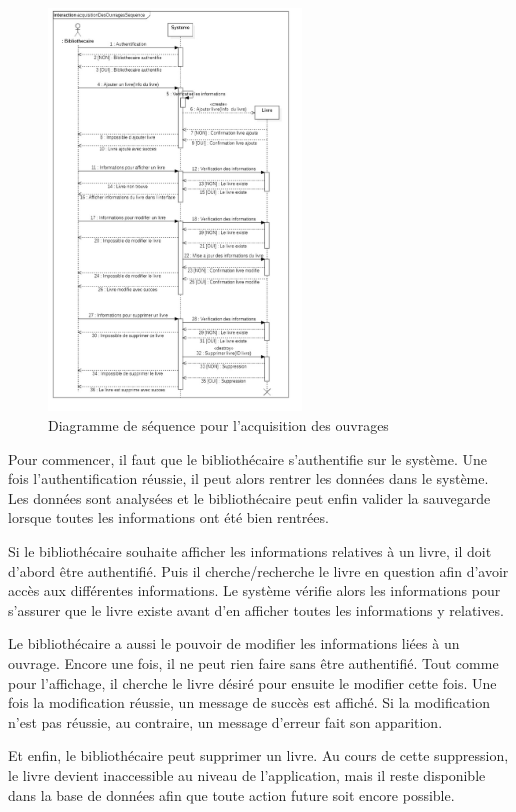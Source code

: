 \paragraph{}
\begin{figure}[h]
        \centering
        \includegraphics[width=0.6\textwidth]{acquisitionDesOuvragesSequence}
        \caption{Diagramme de séquence pour l'acquisition des ouvrages}
        \label{image-acquisitionDesOuvragesSequence}
        \end{figure}
\par
Pour commencer, il faut que le bibliothécaire s'authentifie sur le système.
Une fois l'authentification réussie, il peut alors rentrer les données dans le système.
Les données sont analysées et le bibliothécaire peut enfin valider la sauvegarde 
lorsque toutes les informations ont été bien rentrées. \par 
Si le bibliothécaire souhaite afficher les informations relatives à un livre, il doit d'abord 
être authentifié. Puis il cherche/recherche le livre en question afin d'avoir accès aux 
différentes informations. Le système vérifie alors les informations pour s'assurer que 
le livre existe avant d'en afficher toutes les informations y relatives. \par 
Le bibliothécaire a aussi le pouvoir de modifier les informations liées à un ouvrage.
Encore une fois, il ne peut rien faire sans être authentifié. Tout comme pour l'affichage, 
il cherche le livre désiré pour ensuite le modifier cette fois. Une fois la modification 
réussie, un message de succès est affiché. Si la modification n'est pas réussie, au 
contraire, un message d'erreur fait son apparition. \par 
Et enfin, le bibliothécaire peut supprimer un livre. Au cours de cette suppression, le livre
devient inaccessible au niveau de l'application, mais il reste disponible dans la base de 
données afin que toute action future soit encore possible. \par
